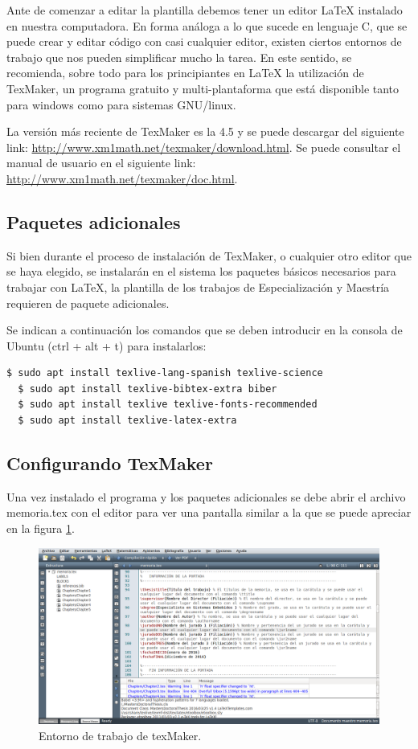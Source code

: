 Ante de comenzar a editar la plantilla debemos tener un editor \LaTeX{} instalado en nuestra computadora.  En forma análoga a lo que sucede en lenguaje C, que se puede crear y editar código con casi cualquier editor, existen ciertos entornos de trabajo que nos pueden simplificar mucho la tarea.  En este sentido, se recomienda, sobre todo para los principiantes en \LaTeX{} la utilización de TexMaker, un programa gratuito y multi-plantaforma que está disponible tanto para windows como para sistemas GNU/linux.

La versión más reciente de TexMaker es la 4.5 y se puede descargar del siguiente link: \url{http://www.xm1math.net/texmaker/download.html}. Se puede consultar el manual de usuario en el siguiente link: \url{http://www.xm1math.net/texmaker/doc.html}.
 

\subsection{Paquetes adicionales}

Si bien durante el proceso de instalación de TexMaker, o cualquier otro editor que se haya elegido, se instalarán en el sistema los paquetes básicos necesarios para trabajar con \LaTeX{}, la plantilla de los trabajos de Especialización y Maestría requieren de paquete adicionales.

Se indican a continuación los comandos que se deben introducir en la consola de Ubuntu (ctrl + alt + t) para instalarlos:

\begin{lstlisting}[language=bash]
  $ sudo apt install texlive-lang-spanish texlive-science 
  $ sudo apt install texlive-bibtex-extra biber
  $ sudo apt install texlive texlive-fonts-recommended
  $ sudo apt install texlive-latex-extra
\end{lstlisting}


\subsection{Configurando TexMaker}


Una vez instalado el programa y los paquetes adicionales se debe abrir el archivo memoria.tex con el editor para ver una pantalla similar a la que se puede apreciar en la figura \ref{fig:texmaker}. 

\begin{figure}[h]
	\centering
	\includegraphics[width=\textwidth]{./Figures/texmaker.png}
	\caption{Entorno de trabajo de texMaker.}
	\label{fig:texmaker}
\end{figure}

